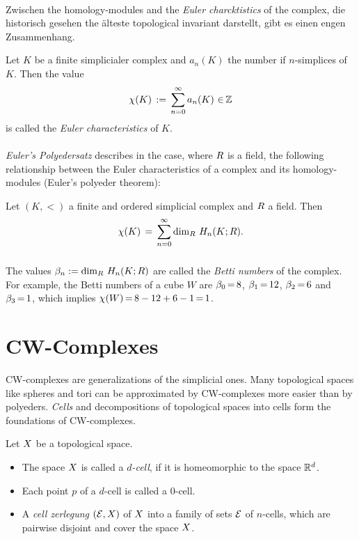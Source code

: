 \documentclass[11pt,twoside]{article}
\def\simK{K}
\begin{document}
\paragraph{}
Zwischen the homology-modules and the \textit{Euler charcktistics} of the complex,
die historisch gesehen the \"alteste topological invariant darstellt,
gibt es einen engen Zusammenhang.

\begin{definition} %
Let $\simK$ be a finite simplicialer complex
and $a_n(\simK)$ the number if $n$-simplices of $\simK$.
Then the value
\[
\chi(\simK) \eqdef \sum_{n=0}^{\infty} a_n(\simK) \, \xeof \Z
\]
is called the \textit{Euler characteristics} of $\simK$.
\end{definition}

\paragraph{}
\textit{Euler's Polyedersatz} describes in the case,
where $\riR$ is a field,
the following relationship between the Euler characteristics of a complex
and its homology-modules (Euler's polyeder theorem):

\begin{theorem1}
Let $(\simK,<)$ a finite and ordered simplicial complex and $\riR$ a field.
Then
\[
\chi(\simK) \= \sum_{n=0}^{\infty} \dim_{\riR} \, H_n(\simK;\riR).
\]
\end{theorem1}

\subparagraph{}
The values $\beta_n := \dim_{\riR} \, H_n(\simK;\riR)$ are called
the \textit{Betti numbers} of the complex.
For example,
the Betti numbers of a cube $W$ are $\beta_0 \eq 8$, $\beta_1 \eq 12$,
$\beta_2 \eq 6$ and $\beta_3 \eq 1$,
which implies $\chi(W) \eq 8-12+6-1 \eq 1$.

\section{CW-Complexes}
CW-complexes are generalizations of the simplicial ones.
Many topological spaces like spheres and tori can be approximated
by CW-complexes more easier than by polyeders.
\textit{Cells} and decompositions of topological spaces into cells form the
foundations of CW-complexes.

\begin{definition} %
Let $\topX$ be a topological space.

\begin{itemize}[leftmargin=22pt]
\item[1.]
The space $\topX$ is called a \textit{$d$-cell},
if it is homeomorphic to the space $\R^d$.

\item[2.]
Each point $p$ of a $d$-cell is called a $0$-cell.

\item[3.]
A \textit{cell zerlegung} $(\cal{E},\topX)$ of $\topX$ into a family of sets
$\cal{E}$ of $n$-cells,
which are pairwise disjoint and cover the space $\topX$.
\end{itemize}
\end{definition}
\end{document}
